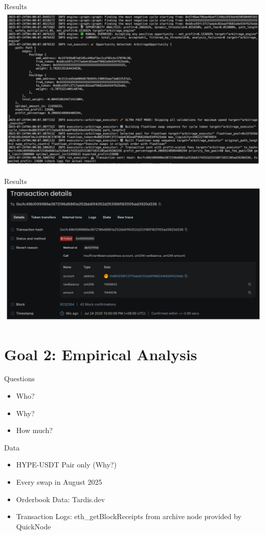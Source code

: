 \documentclass{beamer}
\begin{document}
\begin{frame}{Results}
  \centering
  \includegraphics[width=\textwidth]{./images_goal_1/trace.png}
\end{frame}

\begin{frame}{Results}
  \centering
  \includegraphics[width=\textwidth]{./images_goal_1/explorer.png}
\end{frame}

\section{Goal 2: Empirical Analysis}

\begin{frame}{Questions}
  \begin{itemize}
    \item Who?
    \item Why?
    \item How much?
  \end{itemize}
\end{frame}

\begin{frame}{Data}
  \begin{itemize}
    \item HYPE-USDT Pair only (Why?)
    \item Every swap in August 2025
    \item Orderbook Data: Tardis.dev
    \item Transaction Logs: eth\_getBlockReceipts from archive node provided by QuickNode
  \end{itemize}
\end{frame}
\end{document}
